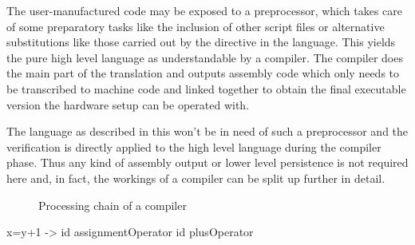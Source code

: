 

The user-manufactured code may be exposed to a preprocessor, which takes care of some preparatory tasks like the inclusion of other script files or alternative substitutions like those carried out by the  directive in the  language. This yields the pure high level language as understandable by a compiler. The compiler does the main part of the translation and outputs assembly code which only needs to be transcribed to machine code and linked together to obtain the final executable version the hardware setup can be operated with.

The language as described in this \paper{} won't be in need of such a preprocessor and the verification is directly applied to the high level language during the compiler phase. Thus any kind of assembly output or lower level persistence is not required here and, in fact, the workings of a compiler can be split up further in detail.


\newcommand{\background}[5]{%
  }

\begin{figure}[H]
	\centering

	

	\caption{Processing chain of a compiler}
	\label{fig:compiler}
\end{figure}

x=y+1 -> id assignmentOperator id plusOperator 

